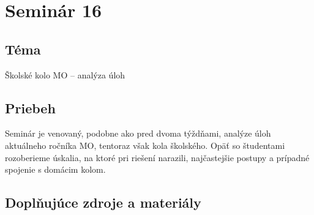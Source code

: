 \section*{Seminár 16}


\subsection*{Téma}
Školské kolo MO -- analýza úloh

\subsection*{Priebeh}

Seminár je venovaný, podobne ako pred dvoma týždňami, analýze úloh aktuálneho ročníka MO, tentoraz však kola školského. Opäť so študentami rozoberieme úskalia, na ktoré pri riešení narazili, najčastejšie postupy a prípadné spojenie s domácim kolom.

\subsection*{Doplňujúce zdroje a materiály}
